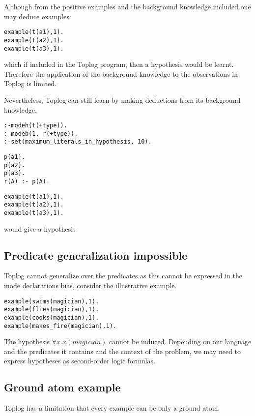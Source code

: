 Although from the positive examples and the background knowledge included one may deduce examples:
\begin{lstlisting}
example(t(a1),1).
example(t(a2),1).
example(t(a3),1).
\end{lstlisting}
which if included in the Toplog program, then a hypothesis
 would be learnt.
Therefore the application of the background knowledge to the observations in Toplog is limited.

Nevertheless, Toplog can still learn by making deductions from its background knowledge.

\begin{lstlisting}
:-modeh(t(+type)).
:-modeb(1, r(+type)).
:-set(maximum_literals_in_hypothesis, 10).
\end{lstlisting}
\begin{minipage}[t]{.35\textwidth}
\begin{lstlisting}
p(a1).
p(a2).
p(a3).
r(A) :- p(A).
\end{lstlisting}
\end{minipage}
\begin{minipage}[t]{.20\textwidth}
\begin{lstlisting}
example(t(a1),1).
example(t(a2),1).
example(t(a3),1).
\end{lstlisting}
\end{minipage}

would give a hypothesis 

\subsection{Predicate generalization impossible}
Toplog cannot generalize over the predicates as this cannot be expressed in the mode declarations bias, consider the illustrative example.
\begin{lstlisting}
example(swims(magician),1).
example(flies(magician),1).
example(cooks(magician),1).
example(makes_fire(magician),1).
\end{lstlisting}
The hypothesis $\forall x. x(magician)$ cannot be induced. Depending on our language and the predicates it contains and the context of the problem, we may need to express hypotheses as second-order logic formulas.

\subsection{Ground atom example}
Toplog has a limitation that every example can be only a ground atom.

